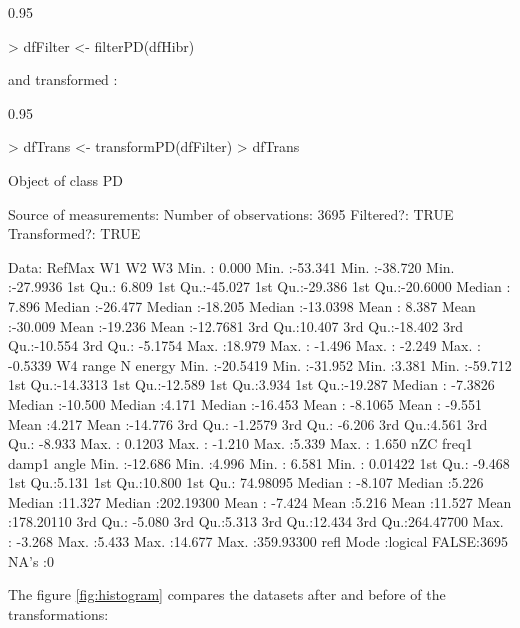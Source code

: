 \documentclass{article}
\renewenvironment{Schunk}{\begin{center}
    \scriptsize
    \begin{boxedminipage}{0.95\textwidth}}{
    \end{boxedminipage}\end{center}}
\begin{document}
\begin{Schunk}
\begin{Sinput}
> dfFilter <- filterPD(dfHibr)
\end{Sinput}
\end{Schunk}
and transformed \cite{Box.Cox1964}:

\begin{Schunk}
\begin{Sinput}
> dfTrans <- transformPD(dfFilter)
> dfTrans
\end{Sinput}
\begin{Soutput}
Object of class  PD 

Source of measurements:  
Number of observations:  3695 
Filtered?:  TRUE 
Transformed?: TRUE 

Data:
     RefMax             W1                W2                W3          
 Min.   : 0.000   Min.   :-53.341   Min.   :-38.720   Min.   :-27.9936  
 1st Qu.: 6.809   1st Qu.:-45.027   1st Qu.:-29.386   1st Qu.:-20.6000  
 Median : 7.896   Median :-26.477   Median :-18.205   Median :-13.0398  
 Mean   : 8.387   Mean   :-30.009   Mean   :-19.236   Mean   :-12.7681  
 3rd Qu.:10.407   3rd Qu.:-18.402   3rd Qu.:-10.554   3rd Qu.: -5.1754  
 Max.   :18.979   Max.   : -1.496   Max.   : -2.249   Max.   : -0.5339  
       W4               range               N             energy       
 Min.   :-20.5419   Min.   :-31.952   Min.   :3.381   Min.   :-59.712  
 1st Qu.:-14.3313   1st Qu.:-12.589   1st Qu.:3.934   1st Qu.:-19.287  
 Median : -7.3826   Median :-10.500   Median :4.171   Median :-16.453  
 Mean   : -8.1065   Mean   : -9.551   Mean   :4.217   Mean   :-14.776  
 3rd Qu.: -1.2579   3rd Qu.: -6.206   3rd Qu.:4.561   3rd Qu.: -8.933  
 Max.   :  0.1203   Max.   : -1.210   Max.   :5.339   Max.   :  1.650  
      nZC              freq1           damp1            angle          
 Min.   :-12.686   Min.   :4.996   Min.   : 6.581   Min.   :  0.01422  
 1st Qu.: -9.468   1st Qu.:5.131   1st Qu.:10.800   1st Qu.: 74.98095  
 Median : -8.107   Median :5.226   Median :11.327   Median :202.19300  
 Mean   : -7.424   Mean   :5.216   Mean   :11.527   Mean   :178.20110  
 3rd Qu.: -5.080   3rd Qu.:5.313   3rd Qu.:12.434   3rd Qu.:264.47700  
 Max.   : -3.268   Max.   :5.433   Max.   :14.677   Max.   :359.93300  
    refl        
 Mode :logical  
 FALSE:3695     
 NA's :0        
\end{Soutput}
\end{Schunk}

The figure \ref{fig:histogram} compares the datasets after and before
of the transformations:
\end{document}
